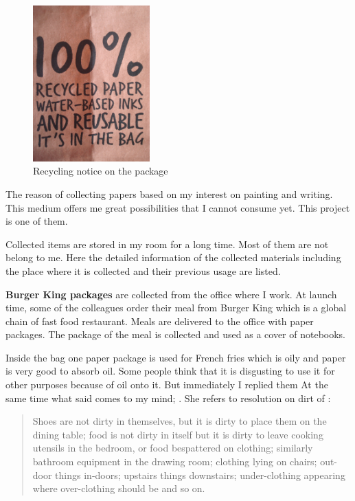 \begin{figure}[h!]
  \centering
  \includegraphics[height=6cm]{project_graphics/recycled_note.jpg}
  \caption{Recycling notice on the package}
  \label{fig:NoteOnPackage}
\end{figure}

The reason of collecting papers based on my interest on painting and writing. This medium offers me great possibilities that I cannot consume yet. This project is one of them.

Collected items are stored in my room for a long time. Most of them are not belong to me. Here the detailed information of the collected materials including the place where it is collected and their previous usage are listed.

\textbf{Burger King packages} are collected from the office where I work. At launch time, some of the colleagues order their meal from Burger King which is a global chain of fast food restaurant. Meals are delivered to the office with paper packages. The package of the meal is collected and used as a cover of notebooks. 

Inside the bag one paper package is used for French fries which is oily and paper is very good to absorb oil. Some people think that it is disgusting to use it for other purposes because of oil onto it. But immediately I replied them  At the same time what \cite[5]{strasser1999waste} said comes to my mind; . She refers to resolution on dirt of \cite[36]{douglas2003purity}:
\begin{quote}
Shoes are not dirty in themselves, but it is dirty to place them on the dining table; food is not dirty in itself but it is dirty to leave cooking utensils in the bedroom, or food bespattered on clothing; similarly bathroom equipment in the drawing room; clothing lying on chairs; out-door things in-doors; upstairs things downstairs; under-clothing appearing where over-clothing should be and so on.
\end{quote}

